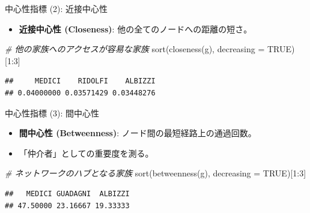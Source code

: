 \documentclass[
  ignorenonframetext,
]{beamer}
\newenvironment{Shaded}{\begin{snugshade}}{\end{snugshade}}
\newcommand{\AttributeTok}[1]{\textcolor[rgb]{0.77,0.63,0.00}{#1}}
\newcommand{\CommentTok}[1]{\textcolor[rgb]{0.56,0.35,0.01}{\textit{#1}}}
\newcommand{\ConstantTok}[1]{\textcolor[rgb]{0.00,0.00,0.00}{#1}}
\newcommand{\DecValTok}[1]{\textcolor[rgb]{0.00,0.00,0.81}{#1}}
\newcommand{\FunctionTok}[1]{\textcolor[rgb]{0.00,0.00,0.00}{#1}}
\newcommand{\NormalTok}[1]{#1}
\newcommand{\SpecialCharTok}[1]{\textcolor[rgb]{0.00,0.00,0.00}{#1}}
\providecommand{\tightlist}{%
  \setlength{\itemsep}{0pt}\setlength{\parskip}{0pt}}
\begin{document}
\begin{frame}[fragile]{中心性指標 (2): 近接中心性}
\protect\hypertarget{ux4e2dux5fc3ux6027ux6307ux6a19-2-ux8fd1ux63a5ux4e2dux5fc3ux6027}{}
\begin{itemize}
\tightlist
\item
  \textbf{近接中心性 (Closeness)}: 他の全てのノードへの距離の短さ。
\end{itemize}

\scriptsize

\begin{Shaded}
\begin{Highlighting}[]
\CommentTok{\# 他の家族へのアクセスが容易な家族}
\FunctionTok{sort}\NormalTok{(}\FunctionTok{closeness}\NormalTok{(g), }\AttributeTok{decreasing =} \ConstantTok{TRUE}\NormalTok{)[}\DecValTok{1}\SpecialCharTok{:}\DecValTok{3}\NormalTok{]}
\end{Highlighting}
\end{Shaded}

\begin{verbatim}
##     MEDICI    RIDOLFI    ALBIZZI 
## 0.04000000 0.03571429 0.03448276
\end{verbatim}

\normalsize
\end{frame}

\begin{frame}[fragile]{中心性指標 (3): 間中心性}
\protect\hypertarget{ux4e2dux5fc3ux6027ux6307ux6a19-3-ux9593ux4e2dux5fc3ux6027}{}
\begin{itemize}
\tightlist
\item
  \textbf{間中心性 (Betweenness)}: ノード間の最短経路上の通過回数。
\item
  「仲介者」としての重要度を測る。
\end{itemize}

\scriptsize

\begin{Shaded}
\begin{Highlighting}[]
\CommentTok{\# ネットワークのハブとなる家族}
\FunctionTok{sort}\NormalTok{(}\FunctionTok{betweenness}\NormalTok{(g), }\AttributeTok{decreasing =} \ConstantTok{TRUE}\NormalTok{)[}\DecValTok{1}\SpecialCharTok{:}\DecValTok{3}\NormalTok{]}
\end{Highlighting}
\end{Shaded}

\begin{verbatim}
##   MEDICI GUADAGNI  ALBIZZI 
## 47.50000 23.16667 19.33333
\end{verbatim}

\normalsize
\end{frame}
\end{document}
